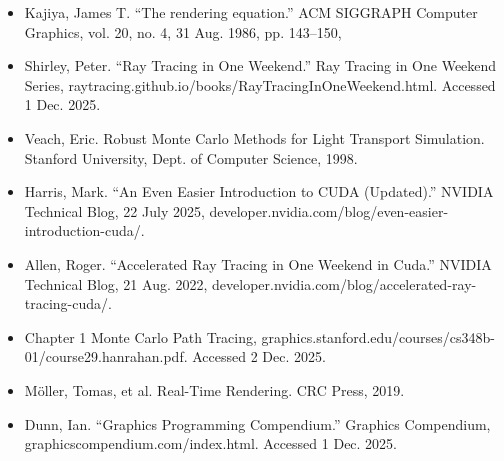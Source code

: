 \documentclass[11pt]{article}
\begin{document}
\begin{itemize}
    \item Kajiya, James T. “The rendering equation.” ACM SIGGRAPH Computer Graphics, vol. 20, no. 4, 31 Aug. 1986, pp. 143–150,  
    \item Shirley, Peter. “Ray Tracing in One Weekend.” Ray Tracing in One Weekend Series, raytracing.github.io/books/RayTracingInOneWeekend.html. Accessed 1 Dec. 2025. 
    \item Veach, Eric. Robust Monte Carlo Methods for Light Transport Simulation. Stanford University, Dept. of Computer Science, 1998. 
    \item Harris, Mark. “An Even Easier Introduction to CUDA (Updated).” NVIDIA Technical Blog, 22 July 2025, developer.nvidia.com/blog/even-easier-introduction-cuda/. 
    \item Allen, Roger. “Accelerated Ray Tracing in One Weekend in Cuda.” NVIDIA Technical Blog, 21 Aug. 2022, developer.nvidia.com/blog/accelerated-ray-tracing-cuda/. 
    \item Chapter 1 Monte Carlo Path Tracing, graphics.stanford.edu/courses/cs348b-01/course29.hanrahan.pdf. Accessed 2 Dec. 2025. 
    \item Möller, Tomas, et al. Real-Time Rendering. CRC Press, 2019. 
    \item Dunn, Ian. “Graphics Programming Compendium.” Graphics Compendium, graphicscompendium.com/index.html. Accessed 1 Dec. 2025. 
\end{itemize}
\end{document}
